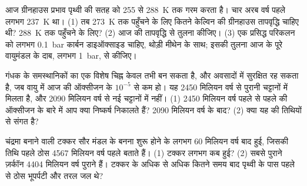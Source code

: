 \begin{exercise}[$\star\star\star$]\label{exo:g12:early-earth:13}
आज ग्रीनहाउस प्रभाव पृथ्वी की सतह को 255 से
\qty{288}{K} तक गरम करता है। चार अरब वर्ष पहले  लगभग
\qty{237}{K} था। (1) तब \qty{273}{K} तक पहुँचने के लिए कितने केल्विन की ग्रीनहाउस तापवृद्धि
चाहिए थी? \qty{288}{K} तक पहुँचने के लिए? (2) आज की तापवृद्धि से तुलना कीजिए।
(3) एक प्रसिद्ध परिकलन को लगभग \qty{0.1}{bar} कार्बन डाइऑक्साइड चाहिए,
थोड़ी मीथेन के साथ; इसकी तुलना आज के पूरे
वायुमंडल के दाब, लगभग \qty{1}{bar}, से कीजिए।
\end{exercise}

\begin{exercise}[$\star\star\star$]\label{exo:g12:early-earth:14}
गंधक के समस्थानिकों का एक विशेष चिह्न केवल तभी बन सकता है, और अवसादों में
सुरक्षित रह सकता है, जब वायु में आज की ऑक्सीजन के $10^{-5}$ से कम हो। यह
2450 मिलियन वर्ष से पुरानी चट्टानों में मिलता है, और 2090 मिलियन वर्ष से नई
चट्टानों में नहीं। (1) 2450 मिलियन वर्ष पहले से पहले की ऑक्सीजन के बारे में आप क्या
निष्कर्ष निकालते हैं? 2090 मिलियन वर्ष के बाद? (2) क्या यह  की
तिथियों से संगत है?
\end{exercise}

\begin{exercise}[$\star\star\star$]\label{exo:g12:early-earth:15}
चंद्रमा बनाने वाली टक्कर सौर मंडल के बनना शुरू होने के लगभग 60 मिलियन वर्ष बाद
हुई, जिसकी तिथि पहले ठोस 4567 मिलियन वर्ष पहले बताते हैं।
(1) टक्कर लगभग कब हुई? (2) सबसे पुराने ज़र्कॉन \num{4404}
मिलियन वर्ष पुराने हैं। टक्कर के अधिक से अधिक कितने समय बाद पृथ्वी के पास पहले से
ठोस भूपर्पटी और तरल जल थे?
\end{exercise}

